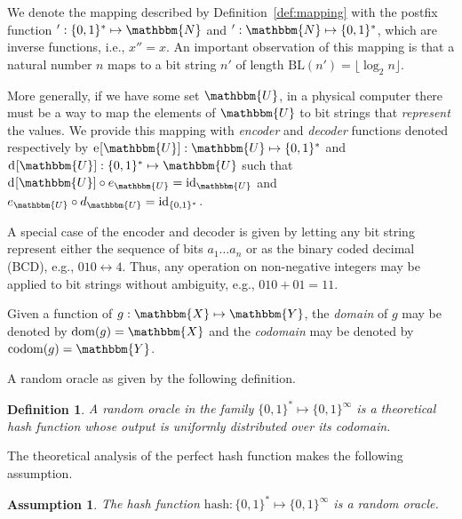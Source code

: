 \documentclass[hidelinks,11pt,final]{article}
\newcommand{\envnumstyle}{section}
\theoremstyle{plain}
\newtheorem{definition}{Definition}[\envnumstyle]
\newtheorem{assumption}{Assumption}
\newcommand{\BL}{\mathrm{BL}}
\newcommand{\Fun}[2][]{\mathrm{#2}_{#1}}
\begin{document}
We denote the mapping described by Definition~\ref{def:mapping} with the postfix function $' : \{0,1\}^* \mapsto \mathbbm{N}$ and $' : \mathbbm{N} \mapsto \{0,1\}^*$, which are inverse functions, i.e., $x'' = x$.
An important observation of this mapping is that a natural number $n$ maps to a bit string $n'$ of length $\BL(n') = \lfloor \log_2 n \rfloor$.

More generally, if we have some set $\mathbbm{U}$, in a physical computer there must be a way to map the elements of $\mathbbm{U}$ to bit strings that \emph{represent} the values.
We provide this mapping with \emph{encoder} and \emph{decoder} functions denoted respectively by $\Fun{e}[\mathbbm{U}] : \mathbbm{U} \mapsto \{0,1\}^*$ and $\Fun{d}[\mathbbm{U}] : \{0,1\}^* \mapsto \mathbbm{U}$ such that $\Fun{d}[\mathbbm{U}] \circ e_\mathbbm{U} = \mathrm{id}_\mathbbm{U}$ and $e_\mathbbm{U} \circ d_\mathbbm{U} = \mathrm{id}_{\{0,1\}^*}$.

A special case of the encoder and decoder is given by letting any bit string represent either the sequence of bits $a_1 \ldots a_n$ or as the binary coded decimal (BCD), e.g., $010 \longleftrightarrow 4$.
Thus, any operation on non-negative integers may be applied to bit strings without ambiguity, e.g., $010 + 01 = 11$.

Given a function of $g : \mathbbm{X} \mapsto \mathbbm{Y}$, the \emph{domain} of $g$ may be denoted by $\mathrm{dom}(g) = \mathbbm{X}$ and the \emph{codomain} may be denoted by $\mathrm{codom}(g) = \mathbbm{Y}$.

A random oracle as given by the following definition.
\begin{definition}
\label{def:randomoracle}
A random oracle in the family $\{0,1\}^{*} \mapsto \{0,1\}^{\infty}$ is a theoretical \emph{hash function} whose output is uniformly distributed over its codomain.
\end{definition}

The theoretical analysis of the perfect hash function makes the following assumption.
\begin{assumption}
\label{asm:ro_approx}
The hash function $\mathrm{hash} : \{0,1\}^{*} \mapsto \{0,1\}^{\infty}$ is a random oracle.
\end{assumption}

\end{document}
